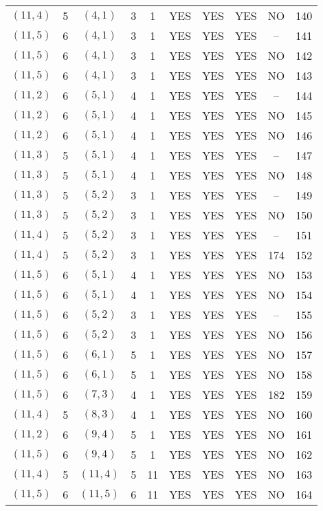 \begin{longtable}{|c|c|c|c|c|c|c|c|c|c|}
$(11, 4)$ & 5 & $(4, 1)$ & 3 & 1 & YES & YES & YES & NO & 140\\
$(11, 5)$ & 6 & $(4, 1)$ & 3 & 1 & YES & YES & YES & -- & 141\\
$(11, 5)$ & 6 & $(4, 1)$ & 3 & 1 & YES & YES & YES & NO & 142\\
$(11, 5)$ & 6 & $(4, 1)$ & 3 & 1 & YES & YES & YES & NO & 143\\
$(11, 2)$ & 6 & $(5, 1)$ & 4 & 1 & YES & YES & YES & -- & 144\\
$(11, 2)$ & 6 & $(5, 1)$ & 4 & 1 & YES & YES & YES & NO & 145\\
$(11, 2)$ & 6 & $(5, 1)$ & 4 & 1 & YES & YES & YES & NO & 146\\
$(11, 3)$ & 5 & $(5, 1)$ & 4 & 1 & YES & YES & YES & -- & 147\\
$(11, 3)$ & 5 & $(5, 1)$ & 4 & 1 & YES & YES & YES & NO & 148\\
$(11, 3)$ & 5 & $(5, 2)$ & 3 & 1 & YES & YES & YES & -- & 149\\
$(11, 3)$ & 5 & $(5, 2)$ & 3 & 1 & YES & YES & YES & NO & 150\\
$(11, 4)$ & 5 & $(5, 2)$ & 3 & 1 & YES & YES & YES & -- & 151\\
$(11, 4)$ & 5 & $(5, 2)$ & 3 & 1 & YES & YES & YES & 174 & 152\\
$(11, 5)$ & 6 & $(5, 1)$ & 4 & 1 & YES & YES & YES & NO & 153\\
$(11, 5)$ & 6 & $(5, 1)$ & 4 & 1 & YES & YES & YES & NO & 154\\
$(11, 5)$ & 6 & $(5, 2)$ & 3 & 1 & YES & YES & YES & -- & 155\\
$(11, 5)$ & 6 & $(5, 2)$ & 3 & 1 & YES & YES & YES & NO & 156\\
$(11, 5)$ & 6 & $(6, 1)$ & 5 & 1 & YES & YES & YES & NO & 157\\
$(11, 5)$ & 6 & $(6, 1)$ & 5 & 1 & YES & YES & YES & NO & 158\\
$(11, 5)$ & 6 & $(7, 3)$ & 4 & 1 & YES & YES & YES & 182 & 159\\
$(11, 4)$ & 5 & $(8, 3)$ & 4 & 1 & YES & YES & YES & NO & 160\\
$(11, 2)$ & 6 & $(9, 4)$ & 5 & 1 & YES & YES & YES & NO & 161\\
$(11, 5)$ & 6 & $(9, 4)$ & 5 & 1 & YES & YES & YES & NO & 162\\
$(11, 4)$ & 5 & $(11, 4)$ & 5 & 11 & YES & YES & YES & NO & 163\\
$(11, 5)$ & 6 & $(11, 5)$ & 6 & 11 & YES & YES & YES & NO & 164\\

\end{longtable}
